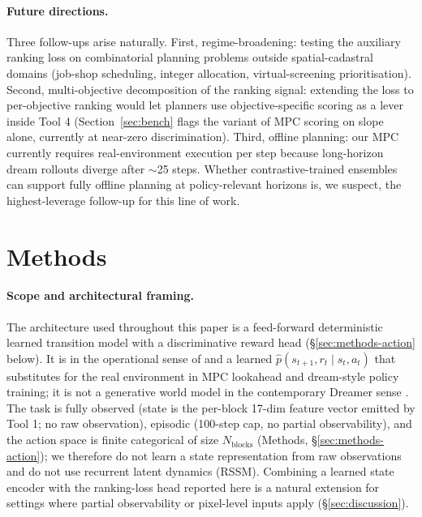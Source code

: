 \documentclass[11pt]{article}
\begin{document}
\paragraph{Future directions.} Three follow-ups arise naturally. First, regime-broadening: testing the auxiliary ranking loss on combinatorial planning problems outside spatial-cadastral domains (job-shop scheduling, integer allocation, virtual-screening prioritisation). Second, multi-objective decomposition of the ranking signal: extending the loss to per-objective ranking would let planners use objective-specific scoring as a lever inside Tool 4 (Section~\ref{sec:bench} flags the variant of MPC scoring on slope alone, currently at near-zero discrimination). Third, offline planning: our MPC currently requires real-environment execution per step because long-horizon dream rollouts diverge after $\sim$25 steps. Whether contrastive-trained ensembles can support fully offline planning at policy-relevant horizons is, we suspect, the highest-leverage follow-up for this line of work.

\section*{Methods}
\label{sec:methods}

\paragraph{Scope and architectural framing.} The architecture used throughout this paper is a feed-forward deterministic learned transition model with a discriminative reward head (\S\ref{sec:methods-action} below). It is in the operational sense of \citet{chua2018deep} and \citet{janner2019trust} a learned $\hat{p}(s_{t+1}, r_t \mid s_t, a_t)$ that substitutes for the real environment in MPC lookahead and dream-style policy training; it is not a generative world model in the contemporary Dreamer sense \citep{hafner2025dreamerv3,ha2018world}. The task is fully observed (state is the per-block 17-dim feature vector emitted by Tool 1; no raw observation), episodic (100-step cap, no partial observability), and the action space is finite categorical of size $N_{\text{blocks}}$ (Methods, \S\ref{sec:methods-action}); we therefore do not learn a state representation from raw observations and do not use recurrent latent dynamics (RSSM). Combining a learned state encoder with the ranking-loss head reported here is a natural extension for settings where partial observability or pixel-level inputs apply (\S\ref{sec:discussion}).
\end{document}
